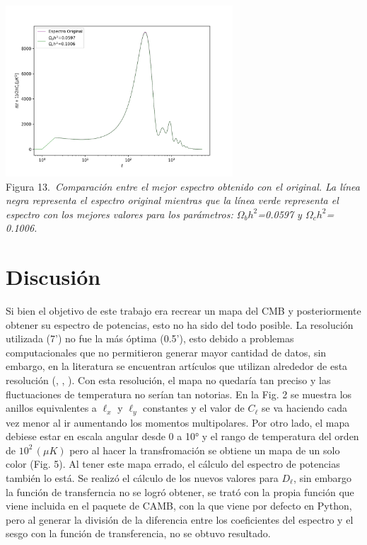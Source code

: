 \documentclass[twocolumn,letterpaper,spanish]{revtex4}
\numberwithin{equation}{section}
\begin{document}
\begin{center}
   \includegraphics[width=85mm]{comparacion2.png}\\
   Figura 13.\emph{\ Comparaci\'on entre el mejor espectro obtenido con el original. La l\'inea negra representa el espectro original mientras que la l\'inea verde representa el espectro con los mejores valores para los par\'ametros: $\Omega_b h^2$=0.0597 y $\Omega_c h^2$= 0.1006.}
\end{center}



\section{Discusi\'on}\label{discusion}

Si bien el objetivo de este trabajo era recrear un mapa del CMB y posteriormente obtener su espectro de potencias, esto no ha sido del todo posible. La resoluci\'on utilizada (7') no fue la m\'as \'optima (0.5'), esto debido a problemas computacionales que no permitieron generar mayor cantidad de datos, sin embargo, en la literatura se encuentran art\'iculos que utilizan alrededor de esta resoluci\'on (\cite{comp1}, \cite{comp2}, \cite{comp3}). Con esta resoluci\'on, el mapa no quedar\'ia tan preciso y las fluctuaciones de temperatura no ser\'ian tan notorias.
En la Fig. 2 se muestra los anillos equivalentes a $\ell_x$ y $\ell_y$ constantes y el valor de $C_{\ell}$ se va haciendo cada vez menor al ir aumentando los momentos multipolares. Por otro lado, el mapa debiese estar en escala angular desde 0 a 10° y el rango de temperatura del orden de $10^2\,(\mu K)$ pero al hacer la transfromaci\'on se obtiene un mapa de un solo color (Fig. 5). Al tener este mapa errado, el c\'alculo del espectro de potencias tambi\'en lo est\'a.
Se realiz\'o el c\'alculo de los nuevos valores para $D_\ell$, sin embargo la funci\'on de transferncia no se logr\'o obtener, se trat\'o con la propia funci\'on que viene incluida en el paquete de CAMB, con la que viene por defecto en Python, pero al generar la divisi\'on de la diferencia entre los coeficientes del espectro y el sesgo con la funci\'on de transferencia, no se obtuvo resultado.
\end{document}
